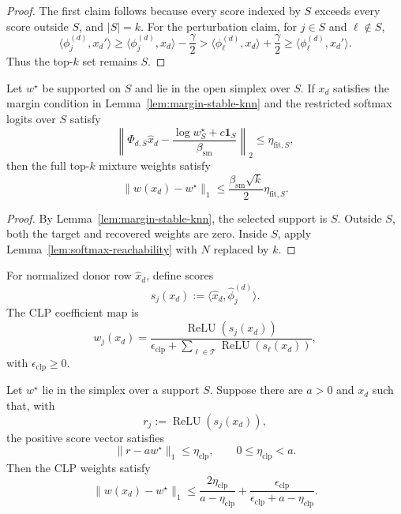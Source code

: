 \begin{proof}
The first claim follows because every score indexed by $S$ exceeds every score outside $S$, and $|S|=k$. For the perturbation claim, for $j\in S$ and $\ell\notin S$,
\[
\langle \phi_j^{(d)},x_d'\rangle
\ge
\langle \phi_j^{(d)},x_d\rangle-\frac{\gamma}{2}
>
\langle \phi_\ell^{(d)},x_d\rangle+\frac{\gamma}{2}
\ge
\langle \phi_\ell^{(d)},x_d'\rangle.
\]
Thus the top-$k$ set remains $S$.
\end{proof}

\begin{corollary}
\label{cor:topk-mixture-reachability}
Let $w^\star$ be supported on $S$ and lie in the open simplex over $S$. If $x_d$ satisfies the margin condition in Lemma~\ref{lem:margin-stable-knn} and the restricted softmax logits over $S$ satisfy
\[
\left\|
\Phi_{d,S}\widehat{x}_d
-
\frac{\log w^\star_S+c\mathbf{1}_S}{\beta_{\mathrm{sm}}}
\right\|_2
\le
\eta_{\mathrm{fit},S},
\]
then the full top-$k$ mixture weights satisfy
\[
\|w(x_d)-w^\star\|_1
\le
\frac{\beta_{\mathrm{sm}}\sqrt{k}}{2}\eta_{\mathrm{fit},S}.
\]
\end{corollary}

\begin{proof}
By Lemma~\ref{lem:margin-stable-knn}, the selected support is $S$. Outside $S$, both the target and recovered weights are zero. Inside $S$, apply Lemma~\ref{lem:softmax-reachability} with $N$ replaced by $k$.
\end{proof}

\begin{assumption}
\label{ass:clp-operator}
For normalized donor row $\widehat{x}_d$, define scores
\[
s_j(x_d):=\langle \widehat{x}_d,\widehat{\phi}^{(d)}_j\rangle.
\]
The CLP coefficient map is
\[
w_j(x_d)=
\frac{\operatorname{ReLU}(s_j(x_d))}{\epsilon_{\mathrm{clp}}+\sum_{\ell\in\mathcal{T}}\operatorname{ReLU}(s_\ell(x_d))},
\]
with $\epsilon_{\mathrm{clp}}\ge 0$.
\end{assumption}

\begin{lemma}
\label{lem:clp-reachability}
Let $w^\star$ lie in the simplex over a support $S$. Suppose there are $a>0$ and $x_d$ such that, with
\[
r_j:=\operatorname{ReLU}(s_j(x_d)),
\]
the positive score vector satisfies
\[
\|r-a w^\star\|_1\le \eta_{\mathrm{clp}},
\qquad
0\le \eta_{\mathrm{clp}}<a.
\]
Then the CLP weights satisfy
\[
\|w(x_d)-w^\star\|_1
\le
\frac{2\eta_{\mathrm{clp}}}{a-\eta_{\mathrm{clp}}}
+
\frac{\epsilon_{\mathrm{clp}}}{\epsilon_{\mathrm{clp}}+a-\eta_{\mathrm{clp}}}.
\]
\end{lemma}

